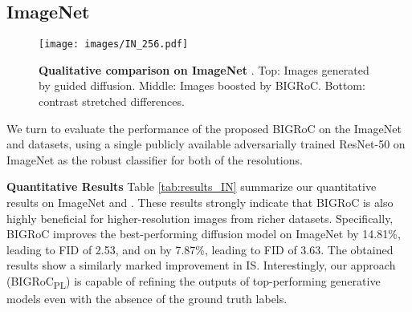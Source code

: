 \documentclass[10pt]{article} \usepackage[accepted]{tmlr}
\begin{document}
\subsection{ImageNet}
\begin{wrapfigure}{R}{0.45\textwidth}
    \vspace{-0.8cm}
    \centering
    \texttt{[image: images/IN\_256.pdf]}
    \caption{\textbf{Qualitative comparison on ImageNet }. Top: Images generated by guided diffusion. Middle: Images boosted by BIGRoC. Bottom: contrast stretched differences.
    }
    \label{fig:qualitative_boost_IN}
    \vspace{-0.8cm}
\end{wrapfigure}
We turn to evaluate the performance of the proposed BIGRoC on the ImageNet  and  datasets, using a single publicly available adversarially trained ResNet-50 on ImageNet as the robust classifier \citep{robustness} for both of the resolutions.


\noindent \textbf{Quantitative Results} 
Table \ref{tab:results_IN} summarize our quantitative results on ImageNet  and .
These results strongly indicate that BIGRoC is also highly beneficial for higher-resolution images from richer datasets.
Specifically, BIGRoC improves the best-performing diffusion model \citep{dhariwal2021diffusion} on ImageNet  by 14.81\%, leading to FID of 2.53, and on  by 7.87\%, leading to FID of 3.63. The obtained results show a similarly marked improvement in IS.
Interestingly, our approach (BIGRoC\textsubscript{PL}) is capable of refining the outputs of top-performing generative models even with the absence of the ground truth labels.
\end{document}
